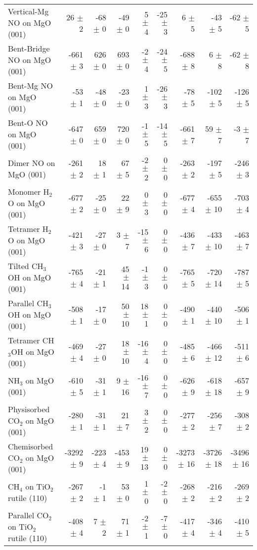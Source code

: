 \begin{table}
\begin{adjustbox}{center,max width=0.9\textwidth}
\begin{tabular}{lrrrrrrrr}
Vertical-Mg NO on MgO (001) & 26 $\pm$ 2 & -68 $\pm$ 0 & -49 $\pm$ 0 & 5 $\pm$ 4 & -25 $\pm$ 3 & 6 $\pm$ 5 & -43 $\pm$ 5 & -62 $\pm$ 5 \\
Bent-Bridge NO on MgO (001) & -661 $\pm$ 3 & 626 $\pm$ 0 & 693 $\pm$ 0 & -2 $\pm$ 4 & -24 $\pm$ 5 & -688 $\pm$ 8 & 6 $\pm$ 8 & -62 $\pm$ 8 \\
Bent-Mg NO on MgO (001) & -53 $\pm$ 1 & -48 $\pm$ 0 & -23 $\pm$ 0 & 1 $\pm$ 3 & -26 $\pm$ 3 & -78 $\pm$ 5 & -102 $\pm$ 5 & -126 $\pm$ 5 \\
Bent-O NO on MgO (001) & -647 $\pm$ 0 & 659 $\pm$ 0 & 720 $\pm$ 0 & -1 $\pm$ 5 & -14 $\pm$ 5 & -661 $\pm$ 7 & 59 $\pm$ 7 & -3 $\pm$ 7 \\
Dimer NO on MgO (001) & -261 $\pm$ 2 & 18 $\pm$ 1 & 67 $\pm$ 5 & -2 $\pm$ 2 & 0 $\pm$ 0 & -263 $\pm$ 2 & -197 $\pm$ 5 & -246 $\pm$ 3 \\
Monomer H$_2$O on MgO (001) & -677 $\pm$ 2 & -25 $\pm$ 0 & 22 $\pm$ 9 & 0 $\pm$ 3 & 0 $\pm$ 0 & -677 $\pm$ 4 & -655 $\pm$ 10 & -703 $\pm$ 4 \\
Tetramer H$_2$O on MgO (001) & -421 $\pm$ 3 & -27 $\pm$ 0 & 3 $\pm$ 7 & -15 $\pm$ 6 & 0 $\pm$ 0 & -436 $\pm$ 7 & -433 $\pm$ 10 & -463 $\pm$ 7 \\
Tilted CH$_3$OH on MgO (001) & -765 $\pm$ 4 & -21 $\pm$ 1 & 45 $\pm$ 14 & -1 $\pm$ 3 & 0 $\pm$ 0 & -765 $\pm$ 5 & -720 $\pm$ 14 & -787 $\pm$ 5 \\
Parallel CH$_3$OH on MgO (001) & -508 $\pm$ 1 & -17 $\pm$ 0 & 50 $\pm$ 10 & 18 $\pm$ 1 & 0 $\pm$ 0 & -490 $\pm$ 1 & -440 $\pm$ 10 & -506 $\pm$ 1 \\
Tetramer CH$_3$OH on MgO (001) & -469 $\pm$ 4 & -27 $\pm$ 0 & 18 $\pm$ 10 & -16 $\pm$ 4 & 0 $\pm$ 0 & -485 $\pm$ 6 & -466 $\pm$ 12 & -511 $\pm$ 6 \\
NH$_3$ on MgO (001) & -610 $\pm$ 5 & -31 $\pm$ 1 & 9 $\pm$ 16 & -16 $\pm$ 7 & 0 $\pm$ 0 & -626 $\pm$ 9 & -618 $\pm$ 18 & -657 $\pm$ 9 \\
Physisorbed CO$_2$ on MgO (001) & -280 $\pm$ 1 & -31 $\pm$ 1 & 21 $\pm$ 7 & 3 $\pm$ 2 & 0 $\pm$ 0 & -277 $\pm$ 2 & -256 $\pm$ 7 & -308 $\pm$ 2 \\
Chemisorbed CO$_2$ on MgO (001) & -3292 $\pm$ 9 & -223 $\pm$ 4 & -453 $\pm$ 9 & 19 $\pm$ 13 & 0 $\pm$ 0 & -3273 $\pm$ 16 & -3726 $\pm$ 18 & -3496 $\pm$ 16 \\
CH$_4$ on TiO$_2$ rutile (110) & -267 $\pm$ 2 & -1 $\pm$ 1 & 53 $\pm$ 0 & 1 $\pm$ 0 & -2 $\pm$ 0 & -268 $\pm$ 2 & -216 $\pm$ 2 & -269 $\pm$ 2 \\
Parallel CO$_2$ on TiO$_2$ rutile (110) & -408 $\pm$ 4 & 7 $\pm$ 2 & 71 $\pm$ 1 & -2 $\pm$ 1 & -7 $\pm$ 0 & -417 $\pm$ 4 & -346 $\pm$ 4 & -410 $\pm$ 5 \\

\end{tabular}
\end{adjustbox}
\end{table}
